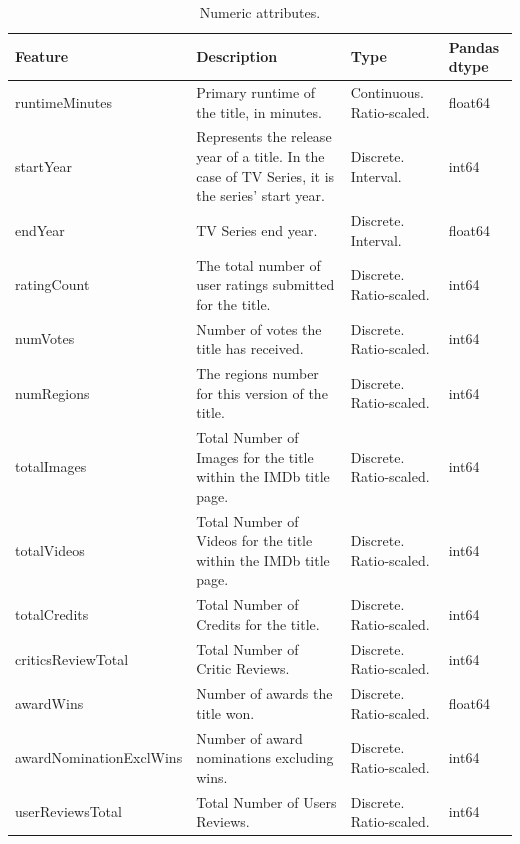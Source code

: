 \begin{table}[h]
    \centering
    \renewcommand{\arraystretch}{1.2}
    \scriptsize
    \begin{tabular}{|p{3cm}|p{5cm}|p{1.5cm}|p{1.5cm}|} 
    \hline
    \textbf{Feature} & \textbf{Description} & \textbf{Type} & \textbf{Pandas dtype} \\ \hline
    runtimeMinutes & Primary runtime of the title, in minutes. & Continuous. Ratio-scaled. & float64 \\ \hline
    startYear & Represents the release year of a title. In the case of TV Series, it is the series' start year. & Discrete. Interval. & int64 \\ \hline
    endYear & TV Series end year. & Discrete. Interval. & float64 \\ \hline
    ratingCount & The total number of user ratings submitted for the title. & Discrete. Ratio-scaled. & int64 \\ \hline
    numVotes & Number of votes the title has received. & Discrete. Ratio-scaled. & int64 \\ \hline
    numRegions & The regions number for this version of the title. & Discrete. Ratio-scaled. & int64 \\ \hline
    totalImages & Total Number of Images for the title within the IMDb title page. & Discrete. Ratio-scaled. & int64 \\ \hline
    totalVideos & Total Number of Videos for the title within the IMDb title page. & Discrete. Ratio-scaled. & int64 \\ \hline
    totalCredits & Total Number of Credits for the title. & Discrete. Ratio-scaled. & int64 \\ \hline
    criticsReviewTotal & Total Number of Critic Reviews. & Discrete. Ratio-scaled. & int64 \\ \hline
    awardWins & Number of awards the title won. & Discrete. Ratio-scaled. & float64 \\ \hline
    awardNominationExclWins & Number of award nominations excluding wins. & Discrete. Ratio-scaled. & int64 \\ \hline
    userReviewsTotal & Total Number of Users Reviews. & Discrete. Ratio-scaled. & int64 \\ \hline
    \end{tabular}
    \caption{Numeric attributes.}
    \label{tab:original_vars_num}
\end{table}

